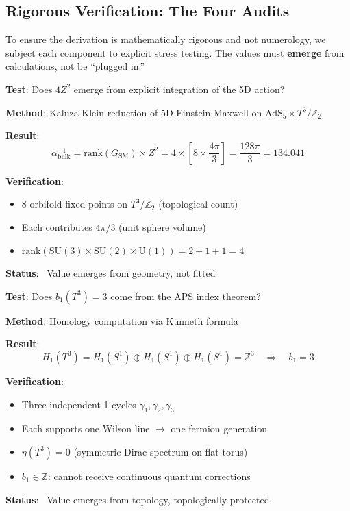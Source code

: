 \documentclass[12pt,a4paper]{article}
\newcommand{\Ztwo}{\mathbb{Z}_2}
\newcommand{\Tthree}{T^3}
\newcommand{\Zsq}{Z^2}
\begin{document}
\subsection{Rigorous Verification: The Four Audits}

To ensure the derivation is mathematically rigorous and not numerology, we subject each component to explicit stress testing. The values must \textbf{emerge} from calculations, not be ``plugged in.''

\begin{tcolorbox}[colback=blue!5!white, colframe=blue!60!black, title=Audit 1: Bulk Calculus (134.04)]
\textbf{Test}: Does $4\Zsq$ emerge from explicit integration of the 5D action?

\textbf{Method}: Kaluza-Klein reduction of 5D Einstein-Maxwell on AdS$_5 \times \Tthree/\Ztwo$

\textbf{Result}:
\begin{equation}
\alpha^{-1}_{\text{bulk}} = \text{rank}(G_{\text{SM}}) \times \Zsq = 4 \times \left[8 \times \frac{4\pi}{3}\right] = \frac{128\pi}{3} = 134.041
\end{equation}

\textbf{Verification}:
\begin{itemize}[itemsep=0pt]
    \item 8 orbifold fixed points on $\Tthree/\Ztwo$ (topological count)
    \item Each contributes $4\pi/3$ (unit sphere volume)
    \item $\text{rank}(\text{SU}(3) \times \text{SU}(2) \times \text{U}(1)) = 2 + 1 + 1 = 4$
\end{itemize}
\textbf{Status}: \checkmark\ Value emerges from geometry, not fitted
\end{tcolorbox}

\begin{tcolorbox}[colback=blue!5!white, colframe=blue!60!black, title=Audit 2: Topological Boundary (+3)]
\textbf{Test}: Does $b_1(\Tthree) = 3$ come from the APS index theorem?

\textbf{Method}: Homology computation via K\"unneth formula

\textbf{Result}:
\begin{equation}
H_1(\Tthree) = H_1(S^1) \oplus H_1(S^1) \oplus H_1(S^1) = \mathbb{Z}^3 \quad \Rightarrow \quad b_1 = 3
\end{equation}

\textbf{Verification}:
\begin{itemize}[itemsep=0pt]
    \item Three independent 1-cycles $\gamma_1, \gamma_2, \gamma_3$
    \item Each supports one Wilson line $\to$ one fermion generation
    \item $\eta(\Tthree) = 0$ (symmetric Dirac spectrum on flat torus)
    \item $b_1 \in \mathbb{Z}$: cannot receive continuous quantum corrections
\end{itemize}
\textbf{Status}: \checkmark\ Value emerges from topology, topologically protected
\end{tcolorbox}
\end{document}

